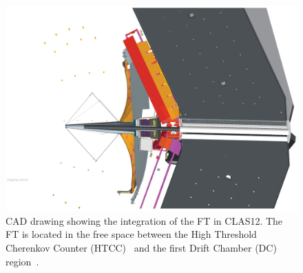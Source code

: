 \begin{figure}[th!]
\centering 
\includegraphics[width=\columnwidth]{./fig/ft_cad.eps} 
\caption{CAD drawing showing the integration of the FT in CLAS12. The FT is located in the free space between
  the High Threshold Cherenkov Counter (HTCC)~\cite{htcc} and the first Drift Chamber (DC) region~\cite{dc}.} 
\label{fig:ftinclas12} 
\end{figure}
